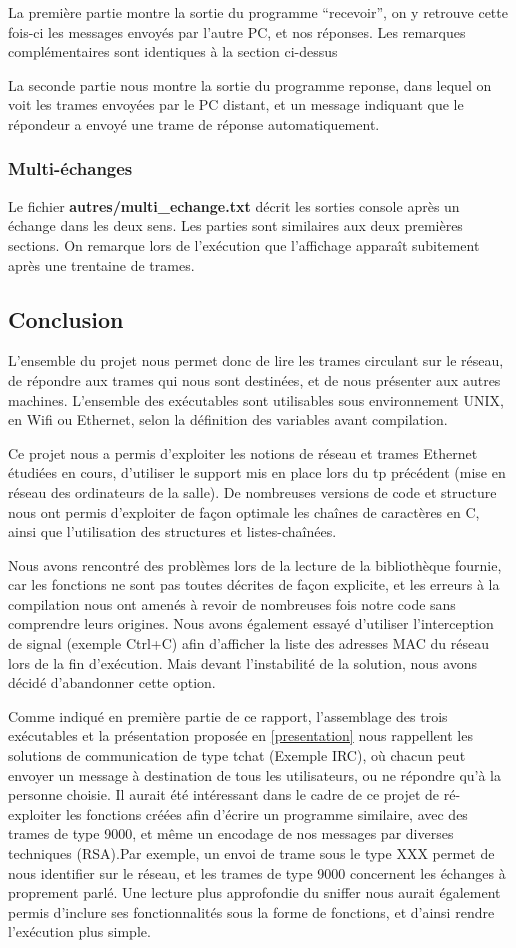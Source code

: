 \documentclass[a4paper,11pt]{article}
\begin{document}
	La première partie montre la sortie du programme ``recevoir'', on y retrouve cette fois-ci les messages envoyés par l'autre PC, et nos réponses. Les remarques complémentaires sont identiques à la section ci-dessus
	
	La seconde partie nous montre la sortie du programme reponse, dans lequel on voit les trames envoyées par le PC distant, et un message indiquant que le répondeur a envoyé une trame de réponse automatiquement.
	\subsubsection{Multi-échanges}
	Le fichier \textbf{autres/multi\_echange.txt} décrit les sorties console après un échange dans les deux sens. Les parties sont similaires aux deux premières sections. On remarque lors de l'exécution que l'affichage apparaît subitement après une trentaine de trames.
	
	\subsection{Conclusion}
	L'ensemble du projet nous permet donc de lire les trames circulant sur le réseau, de répondre aux trames qui nous sont destinées, et de nous présenter aux autres machines. L'ensemble des exécutables sont utilisables sous environnement UNIX, en Wifi ou Ethernet, selon la définition des variables avant compilation.
	
	Ce projet nous a permis d'exploiter les notions de réseau et trames Ethernet étudiées en cours, d'utiliser le support mis en place lors du tp précédent (mise en réseau des ordinateurs de la salle). De nombreuses versions de code et structure nous ont permis d'exploiter de façon optimale les chaînes de caractères en C, ainsi que l'utilisation des structures et listes-chaînées.
	
	Nous avons rencontré des problèmes lors de la lecture de la bibliothèque fournie, car les fonctions ne sont pas toutes décrites de façon explicite, et les erreurs à la compilation nous ont amenés à revoir de nombreuses fois notre code sans comprendre leurs origines. Nous avons également essayé d'utiliser l'interception de signal (exemple Ctrl+C) afin d'afficher la liste des adresses MAC du réseau lors de la fin d'exécution. Mais devant l'instabilité de la solution, nous avons décidé d'abandonner cette option.
	
	Comme indiqué en première partie de ce rapport, l'assemblage des trois exécutables et la présentation proposée en \ref{presentation} nous rappellent les solutions de communication de type tchat (Exemple IRC), où chacun peut envoyer un message à destination de tous les utilisateurs, ou ne répondre qu'à la personne choisie. Il aurait été intéressant dans le cadre de ce projet de ré-exploiter les fonctions créées afin d'écrire un programme similaire, avec des trames de type 9000, et même un encodage de nos messages par diverses techniques (RSA).Par exemple, un envoi de trame sous le type XXX permet de nous identifier sur le réseau, et les trames de type 9000 concernent les échanges à proprement parlé. Une lecture plus approfondie du sniffer nous aurait également permis d'inclure ses fonctionnalités sous la forme de fonctions, et d'ainsi rendre l'exécution plus simple.
\end{document}
